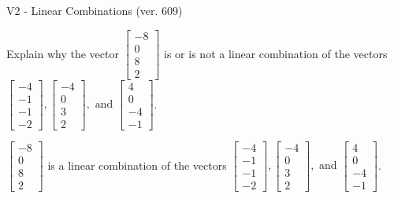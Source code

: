 \begin{exercise}
  \begin{exerciseTitle}V2 - Linear Combinations (ver. 609)\end{exerciseTitle}
  \begin{exerciseStatement}
    Explain why the vector \(\left[\begin{array}{c}
-8 \\
0 \\
8 \\
2
\end{array}\right]\)  is or is not a linear 
	combination of the vectors \(\left[\begin{array}{c}
-4 \\
-1 \\
-1 \\
-2
\end{array}\right] , \left[\begin{array}{c}
-4 \\
0 \\
3 \\
2
\end{array}\right] , \text{ and } \left[\begin{array}{c}
4 \\
0 \\
-4 \\
-1
\end{array}\right]\).
	


  \end{exerciseStatement}
  \begin{exerciseAnswer}
   \(\left[\begin{array}{c}
-8 \\
0 \\
8 \\
2
\end{array}\right]\) 
  	 is  
	a linear combination of the vectors \(\left[\begin{array}{c}
-4 \\
-1 \\
-1 \\
-2
\end{array}\right] , \left[\begin{array}{c}
-4 \\
0 \\
3 \\
2
\end{array}\right] , \text{ and } \left[\begin{array}{c}
4 \\
0 \\
-4 \\
-1
\end{array}\right]\).

	
  


  \end{exerciseAnswer}
\end{exercise}